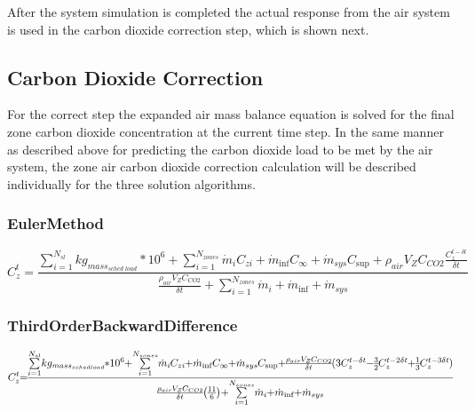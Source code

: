 After the system simulation is completed the actual response from the air system is used in the carbon dioxide correction step, which is shown next.

\subsection{Carbon Dioxide Correction}\label{carbon-dioxide-correction}

For the correct step the expanded air mass balance equation is solved for the final zone carbon dioxide concentration at the current time step. In the same manner as described above for predicting the carbon dioxide load to be met by the air system, the zone air carbon dioxide correction calculation will be described individually for the three solution algorithms.

\subsubsection{EulerMethod}\label{eulermethod-1}

\begin{equation}
C_z^t = \frac{{\sum\limits_{i = 1}^{{N_{sl}}} {k{g_{mas{s_{sched\;load}}}}*{{10}^6}}  + \sum\limits_{i = 1}^{{N_{zones}}} {{{\dot m}_i}} {C_{zi}} + {{\dot m}_{\inf }}{C_\infty } + {{\dot m}_{sys}}{C_{\sup }} + {\rho_{air}}{V_Z}{C_{CO2}}\frac{{C_z^{t - \delta t}}}{{\delta t}}}}{{\frac{{{\rho_{air}}{V_Z}{C_{CO2}}}}{{\delta t}} + \sum\limits_{i = 1}^{{N_{zones}}} {{{\dot m}_i}}  + {{\dot m}_{\inf }} + {{\dot m}_{sys}}}}
\end{equation}

\subsubsection{ThirdOrderBackwardDifference}\label{thirdorderbackwarddifference-1}

\begin{equation}
\medmuskip=0mu
\thinmuskip=0mu
\thickmuskip=0mu
\nulldelimiterspace=0pt
\scriptspace=0pt
C_z^t = \frac{{\sum\limits_{i = 1}^{{N_{sl}}} {k{g_{mas{s_{sched\;load}}}}*{{10}^6}}  + \sum\limits_{i = 1}^{{N_{zones}}} {{{\dot m}_i}} {C_{zi}} + {{\dot m}_{\inf }}{C_\infty } + {{\dot m}_{sys}}{C_{\sup }} + \frac{{{\rho_{air}}{V_Z}{C_{CO2}}}}{{\delta t}}(3C_z^{t - \delta t} - \frac{3}{2}C_z^{t - 2\delta t} + \frac{1}{3}C_z^{t - 3\delta t})}}{{\frac{{{\rho_{air}}{V_Z}{C_{CO2}}}}{{\delta t}}\left( {\frac{{11}}{6}} \right) + \sum\limits_{i = 1}^{{N_{zones}}} {{{\dot m}_i}}  + {{\dot m}_{\inf }} + {{\dot m}_{sys}}}}
\end{equation}

